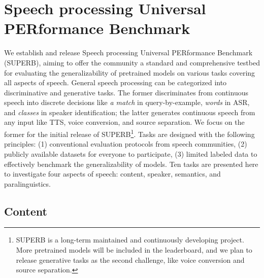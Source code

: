 \documentclass[a4paper]{article}
\begin{document}


\section{Speech processing Universal PERformance Benchmark}

We establish and release Speech processing Universal PERformance Benchmark (SUPERB), aiming to offer the community a standard and comprehensive testbed for evaluating the generalizability of pretrained models on various tasks covering all aspects of speech.
General speech processing can be categorized into discriminative and generative tasks.
The former discriminates from continuous speech into discrete decisions like \textit{a match} in query-by-example, \textit{words} in ASR, and \textit{classes} in speaker identification; the latter generates continuous speech from any input like TTS, voice conversion, and source separation.
We focus on the former for the initial release of SUPERB\footnote{SUPERB is a long-term maintained and continuously developing project. More pretrained models will be included in the leaderboard, and we plan to release generative tasks as the second challenge, like voice conversion and source separation.}.
Tasks are designed with the following principles: (1) conventional evaluation protocols from speech communities, (2) publicly available datasets for everyone to participate, (3) limited labeled data to effectively benchmark the generalizability of models.
Ten tasks are presented here to investigate four aspects of speech: content, speaker, semantics, and paralinguistics.

\subsection{Content}
\end{document}
